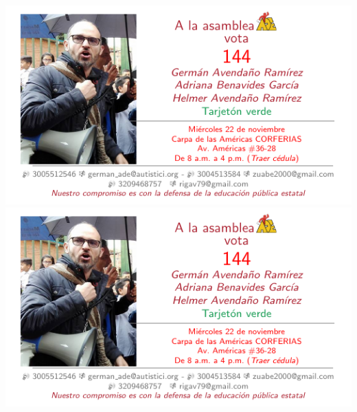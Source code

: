 \documentclass[10pt,letterpaper]{minimal}
\begin{document}
\begin{center}
\hspace{.5mm}\includegraphics[scale=1]{Tarjeta.pdf} \includegraphics[scale=1]{Tarjeta.pdf} \vspace{1.1mm}


\end{center}
\end{document}
